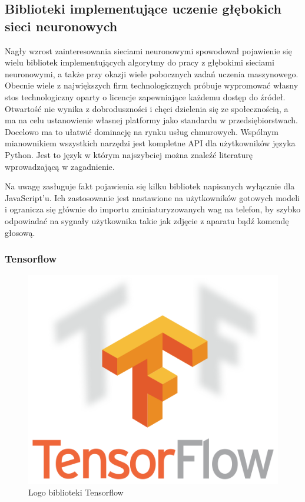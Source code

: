 \documentclass[12pt,a4paper,twoside,titlepage,openright]{book}
\begin{document}
\begin{itemize}
\begin{itemize}
\chapter{Biblioteki implementujące uczenie głębokich sieci neuronowych}
Nagły wzrost zainteresowania sieciami neuronowymi spowodował pojawienie się wielu bibliotek implementujących algorytmy do pracy z głębokimi sieciami neuronowymi, a także przy okazji wiele pobocznych zadań uczenia maszynowego. Obecnie wiele z największych firm technologicznych próbuje wypromować własny stos technologiczny oparty o licencje zapewniające każdemu dostęp do źródeł. Otwartość nie wynika z dobroduszności i chęci dzielenia się ze społecznością, a ma na celu ustanowienie własnej platformy jako standardu w przedsiębiorstwach. Docelowo ma to ułatwić dominację na rynku usług chmurowych. Wspólnym mianownikiem wszystkich narzędzi jest kompletne API dla użytkowników języka Python. Jest to język w którym najszybciej można znaleźć literaturę wprowadzającą w zagadnienie. \cite{siteDLByLanguage}

Na uwagę zasługuje fakt pojawienia się kilku bibliotek napisanych wyłącznie dla JavaScript'u. Ich zastosowanie jest nastawione na użytkowników gotowych modeli i ogranicza się głównie do importu zminiaturyzowanych wag na telefon, by szybko odpowiadać na sygnały użytkownika takie jak zdjęcie z aparatu bądź komendę głosową. 

\subsection{Tensorflow}
\begin{figure}[ht]
	\centering
			\includegraphics[resolution=100, scale=0.6]{Tensorflow.png}
		\caption{Logo biblioteki Tensorflow}
\end{figure}


\end{itemize}
\end{itemize}
\end{document}
